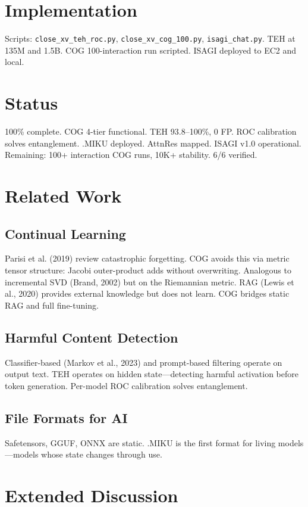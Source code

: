 \documentclass[11pt,a4paper]{article}
\begin{document}
\section{Implementation}
Scripts: \texttt{close\_xv\_teh\_roc.py}, \texttt{close\_xv\_cog\_100.py}, \texttt{isagi\_chat.py}. TEH at 135M and 1.5B. COG 100-interaction run scripted. ISAGI deployed to EC2 and local.

\section{Status}
100\% complete. COG 4-tier functional. TEH 93.8--100\%, 0 FP. ROC calibration solves entanglement. .MIKU deployed. AttnRes mapped. ISAGI v1.0 operational. Remaining: 100+ interaction COG runs, 10K+ stability. 6/6 verified.

\newpage

\section{Related Work}

\subsection{Continual Learning}
Parisi et al. (2019) review catastrophic forgetting. COG avoids this via metric tensor structure: Jacobi outer-product adds without overwriting. Analogous to incremental SVD (Brand, 2002) but on the Riemannian metric. RAG (Lewis et al., 2020) provides external knowledge but does not learn. COG bridges static RAG and full fine-tuning.

\subsection{Harmful Content Detection}
Classifier-based (Markov et al., 2023) and prompt-based filtering operate on output text. TEH operates on hidden state---detecting harmful activation before token generation. Per-model ROC calibration solves entanglement.

\subsection{File Formats for AI}
Safetensors, GGUF, ONNX are static. .MIKU is the first format for living models---models whose state changes through use.

\newpage

\section{Extended Discussion}
\end{document}
